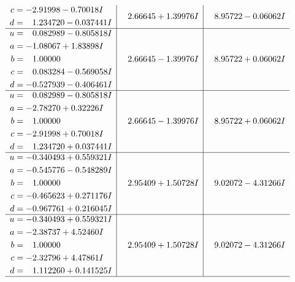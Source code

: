 \documentclass[1p]{elsarticle_modified}
\theoremstyle{definition}
\begin{document}
$$\begin{array}{c|c|c}
\begin{aligned}
c &= -2.91998 - 0.70018 I \\
d &= \phantom{-}1.234720 - 0.037441 I\end{aligned}
 & \phantom{-}2.66645 + 1.39976 I & \phantom{-}8.95722 - 0.06062 I \\ \hline\begin{aligned}
u &= \phantom{-}0.082989 - 0.805818 I \\
a &= -1.08067 + 1.83898 I \\
b &= \phantom{-}1.00000\phantom{ +0.000000I} \\
c &= \phantom{-}0.083284 - 0.569058 I \\
d &= -0.527939 - 0.406461 I\end{aligned}
 & \phantom{-}2.66645 - 1.39976 I & \phantom{-}8.95722 + 0.06062 I \\ \hline\begin{aligned}
u &= \phantom{-}0.082989 - 0.805818 I \\
a &= -2.78270 + 0.32226 I \\
b &= \phantom{-}1.00000\phantom{ +0.000000I} \\
c &= -2.91998 + 0.70018 I \\
d &= \phantom{-}1.234720 + 0.037441 I\end{aligned}
 & \phantom{-}2.66645 - 1.39976 I & \phantom{-}8.95722 + 0.06062 I \\ \hline\begin{aligned}
u &= -0.340493 + 0.559321 I \\
a &= -0.545776 - 0.548289 I \\
b &= \phantom{-}1.00000\phantom{ +0.000000I} \\
c &= -0.465623 + 0.271176 I \\
d &= -0.967761 + 0.216045 I\end{aligned}
 & \phantom{-}2.95409 + 1.50728 I & \phantom{-}9.02072 - 4.31266 I \\ \hline\begin{aligned}
u &= -0.340493 + 0.559321 I \\
a &= -2.38737 + 4.52460 I \\
b &= \phantom{-}1.00000\phantom{ +0.000000I} \\
c &= -2.32796 + 4.47861 I \\
d &= \phantom{-}1.112260 + 0.141525 I\end{aligned}
 & \phantom{-}2.95409 + 1.50728 I & \phantom{-}9.02072 - 4.31266 I\\
 \hline 
 \end{array}$$\newpage$$\begin{array}{c|c|c}  

\end{array}$$
\end{document}
